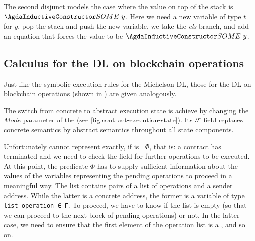 The second disjunct models the case where the value on top of the stack is
$\ACon{SOME}~y$. Here we need a new variable of type $t$ for $y$, pop
the stack and push the new variable, we take the \emph{els} branch,
and add an equation that forces the value to be $\ACon{SOME}~y$.

\subsection{Calculus for the DL on blockchain operations}
\label{sec:calc-dl-blockch}

Just like the symbolic execution rules for the Michelson DL,
those for the DL on blockchain operations (shown in )
are given analogously.
\AbstractUExecState
\AbstractAexecStep






The switch from concrete to abstract execution state is achieve by
changing the $Mode$ parameter of the  (see
\autoref{fig:contract-execution-state}). Its $\mathcal{F}$ field
replaces concrete semantics by abstract semantics throughout all state
components. 


Unfortunately  cannot represent 
exactly, if  is ~$\Phi$, that is: a
contract has terminated and we need to check the 
field for further operations to be executed. 
At this point, the predicate $\Phi$ has to supply sufficient information about the values of the variables
representing the pending operations to proceed in a meaningful way.
The  list contains pairs of a list of operations and a
sender address. While the latter is a concrete address, the former is
a variable of type \verb/list operation ∈ Γ/. To proceed, we have to
know if the list  is empty (so that we can proceed to the next block
of pending operations) or not. In the latter case, we need to ensure
that the first element of the operation list is a
, and so on.

